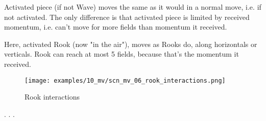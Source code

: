 Activated piece (if not Wave) moves the same as it would in a normal move, i.e. if
not activated. The only difference is that activated piece is limited by received
momentum, i.e. can't move for more fields than momentum it received.

Here, activated Rook (now "in the air"), moves as Rooks do, along horizontals or
verticals. Rook can reach at most 5 fields, because that's the momentum it received.


\clearpage %

\vspace*{-2.1\baselineskip}
\noindent
\begin{figure}[!h]
\texttt{[image: examples/10\_mv/scn\_mv\_06\_rook\_interactions.png]}
\caption{Rook interactions}
\label{fig:scn_mv_06_rook_interactions}
\end{figure}

. . .
















